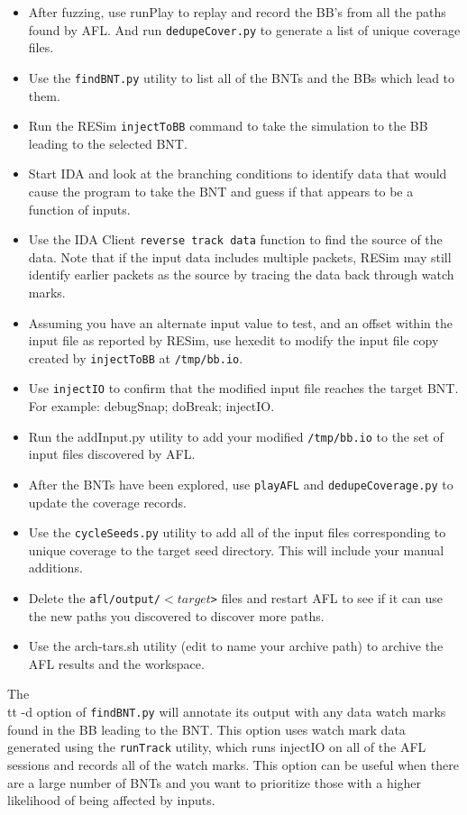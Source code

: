 \documentclass[titlepage]{article}
\begin{document}
\begin{itemize}
\item After fuzzing, use runPlay to replay and record the BB's from all the paths found by AFL.  And run {\tt dedupeCover.py} to generate a list of unique coverage files.
\item Use the {\tt findBNT.py} utility to list all of the BNTs and the BBs which lead to them.
\item Run the RESim {\tt injectToBB} command to take the simulation to the BB leading to the selected BNT.
\item Start IDA and look at the branching conditions to identify data that would cause the program to take the BNT and guess if that appears to be a function of inputs.  
\item Use the IDA Client {\tt reverse track data} function to find the source of the data.  Note that if the input data includes multiple packets, RESim may still
identify earlier packets as the source by tracing the data back through watch marks.
\item Assuming you have an alternate input value to test, and an offset within the input file as reported by RESim, use hexedit to modify the input file copy
created by {\tt injectToBB} at {\tt /tmp/bb.io}.
\item Use {\tt injectIO} to confirm that the modified input file reaches the target BNT.  For example: debugSnap; doBreak; injectIO.
\item Run the addInput.py utility to add your modified {\tt /tmp/bb.io} to the set of input files discovered by AFL.
\item After the BNTs have been explored, use {\tt playAFL} and {\tt dedupeCoverage.py} to update the coverage records.
\item Use the {\tt cycleSeeds.py} utility to add all of the input files corresponding to unique coverage to the target seed directory.  This will include your manual additions.
\item Delete the {\tt afl/output/$<target$>} files and restart AFL to see if it can use the new paths you discovered to discover more paths.
\item Use the arch-tars.sh utility (edit to name your archive path) to archive the AFL results and the workspace.
\end{itemize}

The {\\tt -d} option of {\tt findBNT.py} will annotate its output with any data watch marks found in the BB leading to the BNT.  This option uses watch mark data generated
using the {\tt runTrack} utility, which runs injectIO on all of the AFL sessions and records all of the watch marks.  This option can be useful when there are a large number
of BNTs and you want to prioritize those with a higher likelihood of being affected by inputs.
\end{document}
